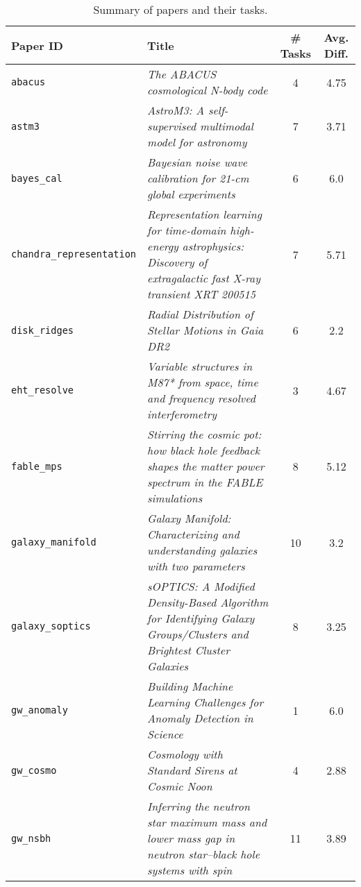 \begin{table}[htbp]
\centering
\caption{Summary of papers and their tasks.}
\label{tab:paper_analysis}
\begin{tabular}{lp{7.5cm}cc}
\toprule
\textbf{Paper ID} & \textbf{Title} & \textbf{\# Tasks} & \textbf{Avg. Diff.} \\
\midrule
\small\texttt{abacus} & \small\textit{The ABACUS cosmological N-body code} \citep{abacus} & 4 & 4.75 \\
\small\texttt{astm3} & \small\textit{AstroM3: A self-supervised multimodal model for astronomy} \citep{astm3} & 7 & 3.71 \\
\small\texttt{bayes\_cal} & \small\textit{Bayesian noise wave calibration for 21-cm global experiments} \citep{bayes_cal} & 6 & 6.0 \\
\small\texttt{chandra\_representation} & \small\textit{Representation learning for time-domain high-energy astrophysics: Discovery of extragalactic fast X-ray transient XRT 200515} \citep{chandra_representation} & 7 & 5.71 \\
\small\texttt{disk\_ridges} & \small\textit{Radial Distribution of Stellar Motions in Gaia DR2} \citep{disk_ridges} & 6 & 2.2 \\
\small\texttt{eht\_resolve} & \small\textit{Variable structures in M87* from space, time and frequency resolved interferometry} \citep{eht_resolve} & 3 & 4.67 \\
\small\texttt{fable\_mps} & \small\textit{Stirring the cosmic pot: how black hole feedback shapes the matter power spectrum in the FABLE simulations} \citep{fable_mps} & 8 & 5.12 \\
\small\texttt{galaxy\_manifold} & \small\textit{Galaxy Manifold: Characterizing and understanding galaxies with two parameters} \citep{galaxy_manifold} & 10 & 3.2 \\
\small\texttt{galaxy\_soptics} & \small\textit{sOPTICS: A Modified Density-Based Algorithm for Identifying Galaxy Groups/Clusters and Brightest Cluster Galaxies} \citep{galaxy_soptics} & 8 & 3.25 \\
\small\texttt{gw\_anomaly} & \small\textit{Building Machine Learning Challenges for Anomaly Detection in Science} \citep{gw_anomaly} & 1 & 6.0 \\
\small\texttt{gw\_cosmo} & \small\textit{Cosmology with Standard Sirens at Cosmic Noon} \citep{gw_cosmo} & 4 & 2.88 \\
\small\texttt{gw\_nsbh} & \small\textit{Inferring the neutron star maximum mass and lower mass gap in neutron star--black hole systems with spin} \citep{gw_nsbh} & 11 & 3.89 \\

\end{tabular}
\end{table}
